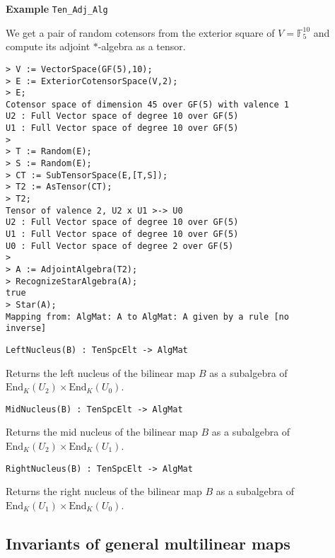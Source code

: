 \begin{framed} {\bf Example} {\tt Ten\_Adj\_Alg}\\
{\small We get a pair of random cotensors from the exterior square of $V=\mathbb{F}_5^{10}$ and compute its adjoint $*$-algebra as a tensor.
\begin{lstlisting}[frame=single,basicstyle=\ttfamily\color{black!30!
teal},backgroundcolor=\color{white!70!gray}]
> V := VectorSpace(GF(5),10);
> E := ExteriorCotensorSpace(V,2);
> E;
Cotensor space of dimension 45 over GF(5) with valence 1
U2 : Full Vector space of degree 10 over GF(5)
U1 : Full Vector space of degree 10 over GF(5)
> 
> T := Random(E);
> S := Random(E);
> CT := SubTensorSpace(E,[T,S]);
> T2 := AsTensor(CT);
> T2;
Tensor of valence 2, U2 x U1 >-> U0
U2 : Full Vector space of degree 10 over GF(5)
U1 : Full Vector space of degree 10 over GF(5)
U0 : Full Vector space of degree 2 over GF(5)
> 
> A := AdjointAlgebra(T2);
> RecognizeStarAlgebra(A);
true
> Star(A);
Mapping from: AlgMat: A to AlgMat: A given by a rule [no 
inverse]
\end{lstlisting} }
\end{framed}

\color{blue}
{\small \begin{verbatim}
LeftNucleus(B) : TenSpcElt -> AlgMat
\end{verbatim} }
\color{black}

Returns the left nucleus of the bilinear map $B$ as a subalgebra of $\text{End}_K(U_2)\times \text{End}_K(U_0)$.

\color{blue}
{\small \begin{verbatim}
MidNucleus(B) : TenSpcElt -> AlgMat
\end{verbatim} }
\color{black}

Returns the mid nucleus of the bilinear map $B$ as a subalgebra of $\text{End}_K(U_2)\times \text{End}_K(U_1)$.

\color{blue}
{\small \begin{verbatim}
RightNucleus(B) : TenSpcElt -> AlgMat
\end{verbatim} }
\color{black}

Returns the right nucleus of the bilinear map $B$ as a subalgebra of $\text{End}_K(U_1)\times \text{End}_K(U_0)$.

\subsection{Invariants of general multilinear maps}

